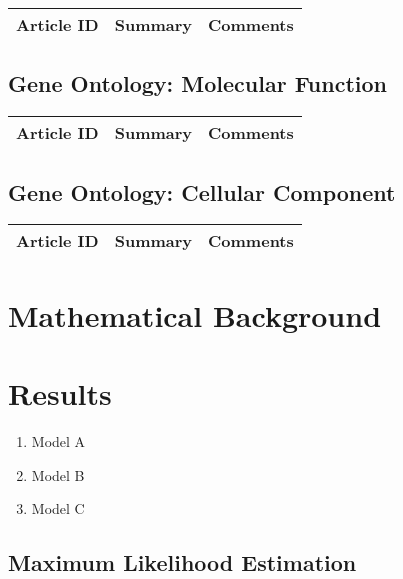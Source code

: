 \begin{table}[H]\centering
	\begin{tabular}{p{1cm}p{4cm}p{3cm}}
		Article ID & Summary & Comments\\
		\hline
		\hline
	\end{tabular}
\end{table}

\subsection{Gene Ontology: Molecular Function}

\begin{table}[H]\centering
	\begin{tabular}{p{1cm}p{4cm}p{3cm}}
		Article ID & Summary & Comments\\
		\hline
		\hline
	\end{tabular}
\end{table}

\subsection{Gene Ontology: Cellular Component}

\begin{table}[H]\centering
	\begin{tabular}{p{1cm}p{4cm}p{3cm}}
		Article ID & Summary & Comments\\
		\hline
		\hline
	\end{tabular}
\end{table}

\section{Mathematical Background}


\section{Results}

\begin{enumerate}
	\item Model A
	\item Model B
	\item Model C
\end{enumerate}

\subsection{Maximum Likelihood Estimation}

